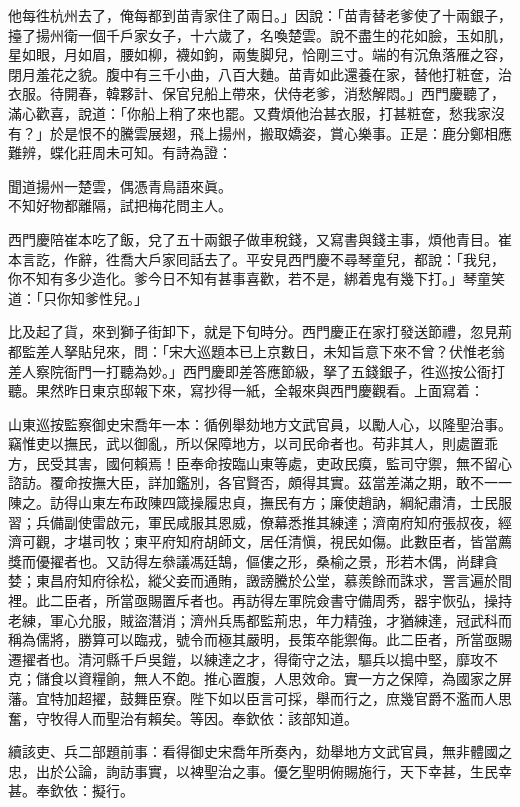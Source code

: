 他每徃杭州去了，俺每都到苗青家住了兩日。」因說：「苗青替老爹使了十兩銀子，擡了揚州衛一個千戶家女子，十六歲了，名喚楚雲。說不盡生的花如臉，玉如肌，星如眼，月如眉，腰如柳，襪如鉤，兩隻脚兒，恰剛三寸。端的有沉魚落雁之容，閉月羞花之貌。腹中有三千小曲，八百大麯。苗青如此還養在家，替他打粧奩，治衣服。待開春，韓夥計、保官兒船上帶來，伏侍老爹，消愁解悶。」西門慶聽了，滿心歡喜，說道：「你船上稍了來也罷。又費煩他治甚衣服，打甚粧奩，愁我家沒有？」於是恨不的騰雲展翅，飛上揚州，搬取嬌姿，賞心樂事。正是：鹿分鄭相應難辨，蝶化莊周未可知。有詩為證：

\begin{myquote} 
聞道揚州一楚雲，偶憑青鳥語來眞。\\不知好物都離隔，試把梅花問主人。
\end{myquote} 

西門慶陪崔本吃了飯，兌了五十兩銀子做車稅錢，又寫書與錢主事，煩他青目。崔本言訖，作辭，徃喬大戶家囘話去了。平安見西門慶不尋琴童兒，都說：「我兒，你不知有多少造化。爹今日不知有甚事喜歡，若不是，綁着鬼有幾下打。」琴童笑道：「只你知爹性兒。」

比及起了貨，來到獅子街卸下，就是下旬時分。西門慶正在家打發送節禮，忽見荊都監差人拏貼兒來，問：「宋大巡題本已上京數日，{}未知旨意下來不曾？伏惟老翁差人察院衙門一打聽為妙。」西門慶即差答應節級，拏了五錢銀子，徃巡按公衙打聽。果然昨日東京邸報下來，寫抄得一紙，全報來與西門慶觀看。上面寫着：

\begin{myquote}[\markfont]
山東巡按監察御史宋喬年一本：循例舉劾地方文武官員，以勵人心，以隆聖治事。竊惟吏以撫民，武以御亂，所以保障地方，以司民命者也。苟非其人，則處置乖方，民受其害，國何賴焉！臣奉命按臨山東等處，吏政民瘼，監司守禦，無不留心諮訪。覆命按撫大臣，詳加鑑別，各官賢否，頗得其實。茲當差滿之期，敢不一一陳之。訪得山東左布政陳四箴操履忠貞，撫民有方；廉使趙訥，綱紀肅清，士民服習；兵備副使雷啟元，軍民咸服其恩威，僚幕悉推其練達；濟南府知府張叔夜，經濟可觀，才堪司牧；東平府知府胡師文，居任清愼，視民如傷。此數臣者，皆當薦獎而優擢者也。又訪得左叅議馮廷鵠，傴僂之形，桑榆之景，形若木偶，尚肆貪婪；東昌府知府徐松，縱父妾而通賄，譭謗騰於公堂，慕羨餘而誅求，詈言遍於間裡。此二臣者，所當亟賜置斥者也。再訪得左軍院僉書守備周秀，器宇恢弘，操持老練，軍心允服，賊盜潛消；濟州兵馬都監荊忠，年力精強，才猶練達，冠武科而稱為儒將，勝算可以臨戎，號令而極其嚴明，長策卒能禦侮。此二臣者，所當亟賜遷擢者也。清河縣千戶吳鎧，以練達之才，得衛守之法，驅兵以搗中堅，靡攻不克；儲食以資糧餉，無人不飽。推心置腹，人思效命。實一方之保障，為國家之屏藩。宜特加超擢，鼓舞臣寮。陛下如以臣言可採，舉而行之，庶幾官爵不濫而人思奮，守牧得人而聖治有賴矣。等因。奉欽依：該部知道。

續該吏、兵二部題前事：看得御史宋喬年所奏內，劾舉地方文武官員，無非體國之忠，出於公論，詢訪事實，以裨聖治之事。優乞聖明俯賜施行，天下幸甚，生民幸甚。奉欽依：擬行。
\end{myquote} 

